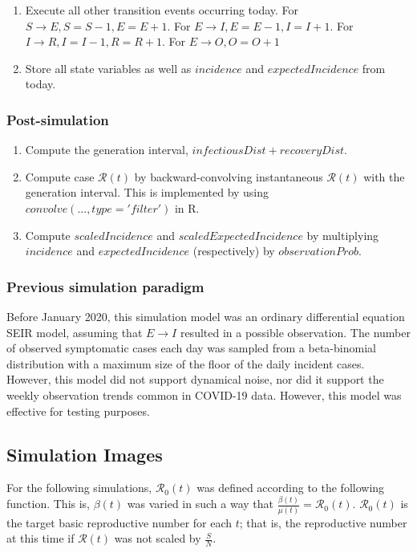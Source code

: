 \documentclass{article}
\newcommand{\nR}{\mathscr{R}}
\begin{document}
\begin{enumerate}
\begin{enumerate}
        \end{enumerate}
    
    \item Execute all other transition events occurring today. For $S \rightarrow E, S=S-1, E=E+1$. For $E \rightarrow I, E=E-1, I=I+1$. For $I \rightarrow R, I = I-1, R = R+1$. For $E \rightarrow O, O = O+1$
    

    
    \item Store all state variables as well as $incidence$ and $expectedIncidence$ from today.
\end{enumerate}

\subsubsection{Post-simulation}
\begin{enumerate}
    \item Compute the generation interval, $infectiousDist + recoveryDist.$ 
    \item Compute case $\nR(t)$ by backward-convolving instantaneous $\nR(t)$ with the generation interval. This is implemented by using $convolve(..., type='filter')$ in R.
    \item Compute $scaledIncidence$ and $scaledExpectedIncidence$ by multiplying $incidence$ and $expectedIncidence$ (respectively) by $observationProb$.
\end{enumerate}


\subsubsection{Previous simulation paradigm}
Before January 2020, this simulation model was an ordinary differential equation SEIR model, assuming that $E \rightarrow I$  resulted in a possible observation. The number of observed symptomatic cases each day was sampled from a beta-binomial distribution with a maximum size of the floor of the daily incident cases. However, this model did not support dynamical noise, nor did it support the weekly observation trends common in COVID-19 data. However, this model was effective for testing purposes.

\clearpage
\subsection{Simulation Images}

For the following simulations, $\nR_0(t)$ was defined according to the following function. This is, $\beta(t)$ was varied in such a way that $\frac{\beta(t)}{\mu(t)} = \nR_0(t)$. $\nR_0(t)$ is the target basic reproductive number for each $t$; that is, the reproductive number at this time if $\nR(t)$ was not scaled by $\frac{S}{N}$.
\end{document}
